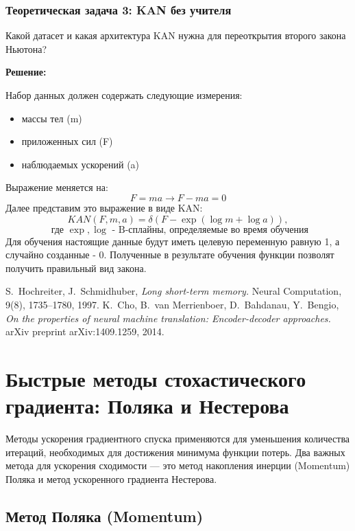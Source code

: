 \subsubsection{Теоретическая задача 3: KAN без учителя}
Какой датасет и какая архитектура KAN нужна для переоткрытия второго закона Ньютона?

\textbf{Решение:}

Набор данных должен содержать следующие измерения:
\begin{itemize}
    \item массы тел (m)
    \item приложенных сил (F)
    \item наблюдаемых ускорений (a)
\end{itemize}

Выражение меняется на:
\[
F=ma\rightarrow F-ma=0
\]
Далее представим это выражение в виде KAN:
\[
KAN(F, m, a) = \delta\left( F-\exp\left( \log m + \log a \right) \right),
\]
\[
\text{ где } \exp, \log \text{ - B-сплайны, определяемые во время обучения}
\]
Для обучения настоящие данные будут иметь целевую переменную равную 1, а случайно созданные - 0. Полученные в результате обучения функции позволят получить правильный вид закона.



\begin{thebibliography}{99}
 S.~Hochreiter, J.~Schmidhuber, \textit{Long short-term memory.} Neural Computation, 9(8), 1735--1780, 1997.
 K.~Cho, B.~van Merrienboer, D.~Bahdanau, Y.~Bengio, \textit{On the properties of neural machine translation: Encoder-decoder approaches.} arXiv preprint arXiv:1409.1259, 2014.
\end{thebibliography}

\section*{Быстрые методы стохастического градиента: Поляка и Нестерова}

Методы ускорения градиентного спуска применяются для уменьшения количества итераций, необходимых для достижения минимума функции потерь. Два важных метода для ускорения сходимости — это метод накопления инерции (Momentum) Поляка и метод ускоренного градиента Нестерова.


\subsection*{Метод Поляка (Momentum)}

